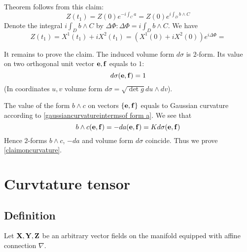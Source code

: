 \documentclass[12pt]{article}
\theoremstyle{theorem}
\numberwithin{equation}{section}
\begin{document}
Theorem follows from this claim:
           \begin{equation}\label{complexrotation2}
      Z(t_1)=Z(0)e^{-i\int_C a}=Z(0)e^{i\int_D b\wedge C}
   \end{equation}
Denote the integral ${i\int_D b\wedge C}$ by $\Delta \Phi\colon \Delta \Phi={i\int_D b\wedge C}$. We have
           \begin{equation}\label{complexrotation2}
      Z(t_1)=X^1(t_1)+iX^2(t_1)=\left(X^1(0)+iX^2(0)\right)e^{i\Delta\Phi}=
   \end{equation}

\medskip

 It remains to prove the claim.  The induced volume form $d\sigma$ is $2$-form. Its value
 on two orthogonal unit vector ${\bf e},{\bf f}$ equals to $1$:
              \begin{equation}\label{valueonorthonormalvectors}
                d\sigma ({\bf e},{\bf f})=1
              \end{equation}
(In coordinates $u,v$ volume form $d\sigma=\sqrt{\det g}du\wedge dv$).

The value of the form $b\wedge c$ on vectors $\{{\bf e},{\bf f}\}$ equals to Gaussian curvature according to \eqref{gaussiancurvatureintermsof form a}.
We see that
             $$
        b\wedge c({\bf e},{\bf f})=-da({\bf e},{\bf f})=K d\sigma ({\bf e},{\bf f})
             $$
Hence $2$-forms $b\wedge c$, $-da$ and volume form $d\sigma$ coincide. Thus we prove \eqref{claimoncurvature}.


\section {Curvtature tensor}

\subsection {Definition}

Let ${\bf X},{\bf Y},{\bf Z}$ be an arbitrary vector fields on the manifold equipped with affine connection  $\nabla$.
\end{document}
